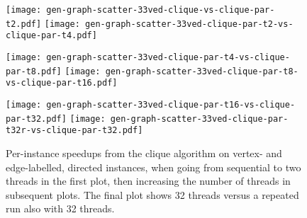 \documentclass[sigconf]{acmart}
\begin{document}
% 
% 
% 
% 
\begin{figure}[p]
    \texttt{[image: gen-graph-scatter-33ved-clique-vs-clique-par-t2.pdf]}
    \hfill
    \texttt{[image: gen-graph-scatter-33ved-clique-par-t2-vs-clique-par-t4.pdf]}

    \vspace*{1em}

    \texttt{[image: gen-graph-scatter-33ved-clique-par-t4-vs-clique-par-t8.pdf]}
    \hfill
    \texttt{[image: gen-graph-scatter-33ved-clique-par-t8-vs-clique-par-t16.pdf]}

    \vspace*{1em}

    \texttt{[image: gen-graph-scatter-33ved-clique-par-t16-vs-clique-par-t32.pdf]}
    \hfill
    \texttt{[image: gen-graph-scatter-33ved-clique-par-t32r-vs-clique-par-t32.pdf]}

    \caption{Per-instance speedups from the clique algorithm on vertex- and edge-labelled, directed
    instances, when going from sequential to two threads in the first plot, then increasing the
    number of threads in subsequent plots. The final plot shows 32 threads versus a repeated run
    also with 32 threads.}
\end{figure}
% 
\end{document}
